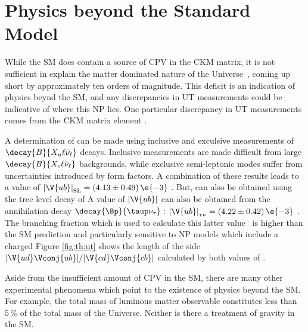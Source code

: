 \section{Physics beyond the Standard Model}

While the SM does contain a source of CPV in the CKM matrix, it is not sufficient in explain the
matter dominated nature of the Universe~\cite{Cline:2006ts,Huet:1994jb}, coming up short by
approximately ten orders of magnitude.
This deficit is an indication of physics beynd the SM, and any discrepancies in UT measurements
could be indicative of where this NP lies.
One particular discrepancy in UT measurements comes from the CKM matrix element .

A determination of 
can be made using inclusive and exculsive measurements of
$\decay{B}{X_u\ell\bar\nu_\ell}$ decays.
Inclusive measurements are made difficult from large
$\decay{B}{X_c\ell\bar\nu_\ell}$ backgrounds, while exclusive semi-leptonic modes suffer from
uncertainties introduced by form factors.
A combination of these results leads to a value of
$\left|\V{ub}\right|_\mathrm{SL}=\left(4.13\pm0.49\right)\e{-3}$ \cite{PDG2012}.
But,  can also be obtained using the tree level decay of
A value of $\left|\V{ub}\right|$ can also be obtained from the annihilation decay
$\decay{\Bp}{\taup\nu_\tau}:$
$\left|\V{ub}\right|_{\tau\nu}=\left(4.22\pm0.42\right)\e{-3}$ \cite{PDG2012}.
The branching fraction which is used to calculate this latter value~\cite{Amhis:2012bh} is
higher than the SM prediction and particularly sensitive to NP models which include a charged
Figure \ref{fig:th:ut} shows the length of the side $|\V{ud}\Vconj{ub}|/|\V{cd}\Vconj{cb}|$
calculated by both values of .

Aside from the insufficient amount of CPV in the SM,
there are many other experimental phenomena which point to the existence of physics beyond the SM.
For example, the total mass of luminous matter observable constitutes less than $5\,\%$ of the
total mass of the Universe.
Neither is there a treatment of gravity in the SM.

